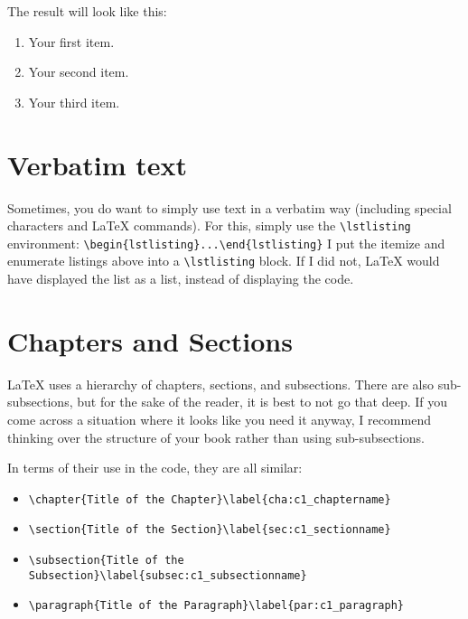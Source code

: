 The result will look like this:%
\begin{enumerate}
	\item Your first item.
	\item Your second item.
	\item Your third item.
\end{enumerate}


\section{Verbatim text}\label{sec:c1_verbatim}

Sometimes, you do want to simply use text in a verbatim way (including special
characters and \LaTeX{} commands). For this, simply use the
\lstinline[language=Tex]!\lstlisting! environment:
\lstinline[language=Tex]!\begin{lstlisting}...\end{lstlisting}!%
I put the itemize and enumerate listings above into a
\lstinline[language=Tex]!\lstlisting! block. If I did not, \LaTeX{} would have
displayed the list as a list, instead of displaying the code.



\section{Chapters and Sections}\label{sec:c1_chaptersandsections}

\LaTeX{} uses a hierarchy of chapters, sections, and subsections. There are also
sub-subsections, but for the sake of the reader, it is best to not go that deep.
If you come across a situation where it looks like you need it anyway, I
recommend thinking over the structure of your book rather than using
sub-subsections. 

In terms of their use in the code, they are all similar:

\begin{itemize}
    \item \lstinline[language=Tex]!\chapter{Title of the Chapter}\label{cha:c1_chaptername}!
    \item \lstinline[language=Tex]!\section{Title of the Section}\label{sec:c1_sectionname}!
    \item \lstinline[language=Tex]!\subsection{Title of the Subsection}\label{subsec:c1_subsectionname}!
    \item \lstinline[language=Tex]!\paragraph{Title of the Paragraph}\label{par:c1_paragraph}!
\end{itemize}


